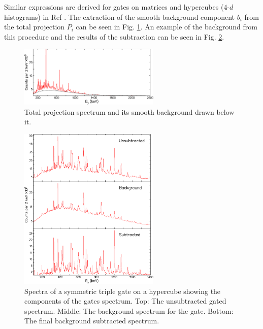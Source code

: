 Similar expressions are derived for gates on matrices and hypercubes ($4$-$d$ histograms) in Ref \cite{symBGSub}. The extraction of the smooth background component $b_{i}$ from the total projection $P_{i}$ can be seen in  Fig. \ref{fig:chp3-smooth-bg}. An example of the background from this procedure and the results of the subtraction can be seen in Fig. \ref{fig:chp3-sym-bg-sub}. 
\begin{figure}[h!]
	\centerline{\includegraphics[width=0.6\textwidth]{./img/c3/smth_bg.eps}}
	\caption{Total projection spectrum and its smooth background drawn below it.\label{fig:chp3-smooth-bg}}
\end{figure}

\begin{figure}[h!]
	\centerline{\includegraphics[width=0.6\textwidth]{./img/c3/bg_sub_ex.eps}}
	\caption{Spectra of a symmetric triple gate on a hypercube showing the components of the gates spectrum. Top: The unsubtracted gated spectrum. Middle: The background spectrum for the gate. Bottom: The final background subtracted spectrum.\label{fig:chp3-sym-bg-sub}}
\end{figure}

